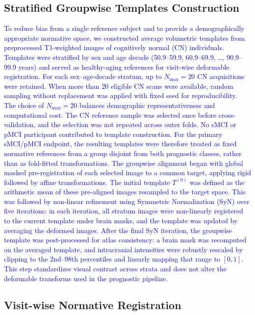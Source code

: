 \documentclass[review]{elsarticle}
\newcommand{\code}[1]{\texttt{\seqsplit{#1}}}
\begin{document}
	\subsection{Stratified Groupwise Templates Construction}
	\label{sec:groupwise}
	\textcolor{blue}{To reduce bias from a single reference subject \cite{reuter-2012} and to provide a demographically appropriate normative space, we constructed average volumetric templates from preprocessed T1-weighted images of cognitively normal (CN) individuals. Templates were stratified by sex and age decade (50.9--59.9, 60.9--69.9, \ldots, 90.9--99.9 years) and served as healthy-aging references for visit-wise deformable registration.
		For each sex--age-decade stratum, up to $N_{\max}=20$ CN acquisitions were retained. When more than 20 eligible CN scans were available, random sampling without replacement was applied with fixed seed \code{RANDOM\_SEED=7} for reproducibility. The choice of $N_{\max}=20$ balances demographic representativeness and computational cost.
		The CN reference sample was selected once before cross-validation, and the selection was not repeated across outer folds. No sMCI or pMCI participant contributed to template construction. For the primary sMCI/pMCI endpoint, the resulting templates were therefore treated as fixed normative references from a group disjoint from both prognostic classes, rather than as fold-fitted transformations.
		The groupwise alignment began with global masked pre-registration of each selected image to a common target, applying rigid followed by affine transformations. The initial template $T^{(0)}$ was defined as the arithmetic mean of these pre-aligned images resampled to the target space. This was followed by non-linear refinement using Symmetric Normalization (SyN) \cite{avants-2014} over five iterations: in each iteration, all stratum images were non-linearly registered to the current template under brain masks, and the template was updated by averaging the deformed images. After the final SyN iteration, the groupwise template was post-processed for atlas consistency: a brain mask was recomputed on the averaged template, and intracranial intensities were robustly rescaled by clipping to the 2nd--98th percentiles and linearly mapping that range to $[0,1]$. This step standardizes visual contrast across strata and does not alter the deformable transforms used in the prognostic pipeline.}
	
	\subsection{Visit-wise Normative Registration}\label{subsec:deslocamento_longitudinal}
	
\end{document}
